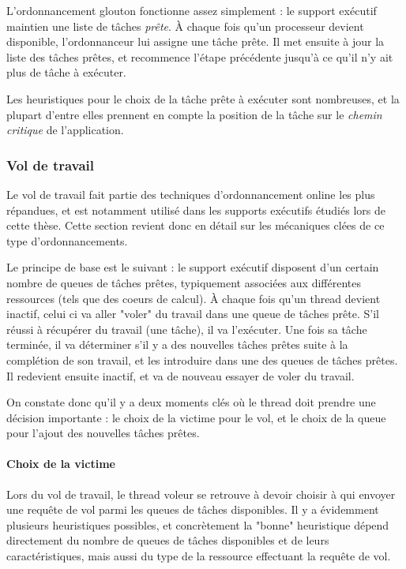 L'ordonnancement glouton fonctionne assez simplement : le support exécutif maintien une liste de tâches \emph{prête}.
À chaque fois qu'un processeur devient disponible, l'ordonnanceur lui assigne une tâche prête.
Il met ensuite à jour la liste des tâches prêtes, et recommence l'étape précédente jusqu'à ce qu'il n'y ait plus de tâche à exécuter.

Les heuristiques pour le choix de la tâche prête à exécuter sont nombreuses, et la plupart d'entre elles prennent en compte la position de la tâche sur le \emph{chemin critique} de l'application.

\subsubsection{Vol de travail}\label{sec:context:runtimes:ws}

Le vol de travail fait partie des techniques d'ordonnancement online les plus répandues, et est notamment utilisé dans les supports exécutifs étudiés lors de cette thèse.
Cette section revient donc en détail sur les mécaniques clées de ce type d'ordonnancements.

Le principe de base est le suivant : le support exécutif disposent d'un certain nombre de queues de tâches prêtes, typiquement associées aux différentes ressources (tels que des coeurs de calcul).
À chaque fois qu'un thread devient inactif, celui ci va aller "voler" du travail dans une queue de tâches prête.
S'il réussi à récupérer du travail (une tâche), il va l'exécuter.
Une fois sa tâche terminée, il va déterminer s'il y a des nouvelles tâches prêtes suite à la complétion de son travail, et les introduire dans une des queues de tâches prêtes.
Il redevient ensuite inactif, et va de nouveau essayer de voler du travail.

On constate donc qu'il y a deux moments clés où le thread doit prendre une décision importante : le choix de la victime pour le vol, et le choix de la queue pour l'ajout des nouvelles tâches prêtes.

\paragraph{Choix de la victime}

Lors du vol de travail, le thread voleur se retrouve à devoir choisir à qui envoyer une requête de vol parmi les queues de tâches disponibles.
Il y a évidemment plusieurs heuristiques possibles, et concrètement la "bonne" heuristique dépend directement du nombre de queues de tâches disponibles et de leurs caractéristiques, mais aussi du type de la ressource effectuant la requête de vol.

